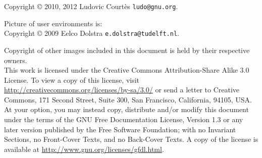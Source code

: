 \documentclass{beamer}
\begin{document}
\begin{frame}{}

  \vfill{
    \tiny{
      Copyright \copyright{} 2010, 2012 Ludovic Courtès \texttt{ludo@gnu.org}.

      Picture of user environments is: \\
      Copyright \copyright{} 2009 Eelco Dolstra \texttt{e.dolstra@tudelft.nl}.

      Copyright of other images included in this document is held by
      their respective owners.
      \\[3.0mm]
      This work is licensed under the \alert{Creative Commons
        Attribution-Share Alike 3.0} License.  To view a copy of this
      license, visit
      \url{http://creativecommons.org/licenses/by-sa/3.0/} or send a
      letter to Creative Commons, 171 Second Street, Suite 300, San
      Francisco, California, 94105, USA.
      \\
      At your option, you may instead copy, distribute and/or modify
      this document under the terms of the \alert{GNU Free Documentation
        License, Version 1.3 or any later version} published by the Free
      Software Foundation; with no Invariant Sections, no Front-Cover
      Texts, and no Back-Cover Texts.  A copy of the license is
      available at \url{http://www.gnu.org/licenses/gfdl.html}.
    }
  }

\end{frame}
\end{document}
